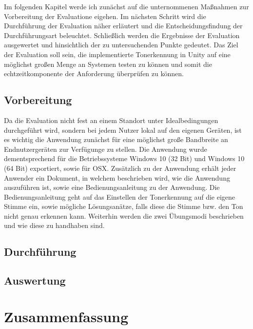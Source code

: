 Im folgenden Kapitel werde ich zunächst auf die unternommenen Maßnahmen zur Vorbereitung der Evaluatione eigehen. Im nächsten Schritt wird die Durchführung der Evaluation näher erläutert und die Entscheidungsfindung der Durchführungsart beleuchtet. Schließlich werden die Ergebnisse der Evaluation ausgewertet und hinsichtlich der zu untersuchenden Punkte gedeutet.  Das Ziel der Evaluation soll sein, die implementierte Tonerkennung in Unity auf eine möglichst großen Menge an Systemen testen zu können und somit die echtzeitkomponente der Anforderung überprüfen zu können. 
\section{Vorbereitung}
Da die Evaluation nicht fest an einem Standort unter Idealbedingungen durchgeführt wird, sondern bei jedem Nutzer lokal auf den eigenen Geräten, ist es wichtig die Anwendung zunächst für eine möglichst große Bandbreite an Endnutzergeräten zur Verfügunge zu stellen. Die Anwendung wurde dementsprechend für die Betriebssysteme Windows 10 (32 Bit) und Windows 10 (64 Bit) exportiert, sowie für OSX. Zusätzlich zu der Anwendung erhält jeder Anwender ein Dokument, in welchem beschrieben wird, wie die Anwendung auszuführen ist, sowie eine Bedienungsanleitung zu der Anwendung. Die Bedienungsanleitung geht auf das Einstellen der Tonerkennung auf die eigene Stimme ein, sowie mögliche Lösungsanätze, falls diese die Stimme bzw. den Ton nicht genau erkennen kann. Weiterhin werden die zwei Übungsmodi beschrieben und wie diese zu handhaben sind.  
\section{Durchführung}
\section{Auswertung}


\chapter{Zusammenfassung}


